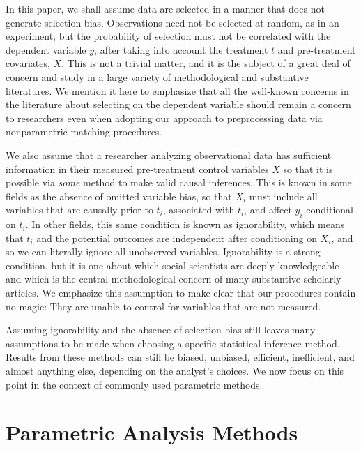 \documentclass[11pt,titlepage]{article}
\begin{document}
In this paper, we shall assume data are selected in a manner that does
not generate selection bias.  Observations need not be selected at
random, as in an experiment, but the probability of selection must not
be correlated with the dependent variable $y$, after taking into
account the treatment $t$ and pre-treatment covariates, $X$.  This is
not a trivial matter, and it is the subject of a great deal of concern
and study in a large variety of methodological and substantive
literatures.  We mention it here to emphasize that all the well-known
concerns in the literature about selecting on the dependent variable
should remain a concern to researchers even when adopting our approach
to preprocessing data via nonparametric matching procedures.

We also assume that a researcher analyzing observational data has
sufficient information in their measured pre-treatment control
variables $X$ so that it is possible via \emph{some} method to make
valid causal inferences.  This is known in some fields as the absence
of omitted variable bias, so that $X_i$ must include all variables
that are causally prior to $t_i$, associated with $t_i$, and affect
$y_i$ conditional on $t_i$.  In other fields, this same condition is
known as ignorability, which means that $t_i$ and the potential
outcomes are independent after conditioning on $X_i$, and so we can
literally ignore all unobserved variables.  Ignorability is a strong
condition, but it is one about which social scientists are deeply
knowledgeable and which is the central methodological concern of many
substantive scholarly articles.  We emphasize this assumption to make
clear that our procedures contain no magic: They are unable to control
for variables that are not measured.

Assuming ignorability and the absence of selection bias still leaves
many assumptions to be made when choosing a specific statistical
inference method.  Results from these methods can still be biased,
unbiased, efficient, inefficient, and almost anything else, depending
on the analyst's choices.  We now focus on this point in the context
of commonly used parametric methods.

\section{Parametric Analysis Methods}
\end{document}
